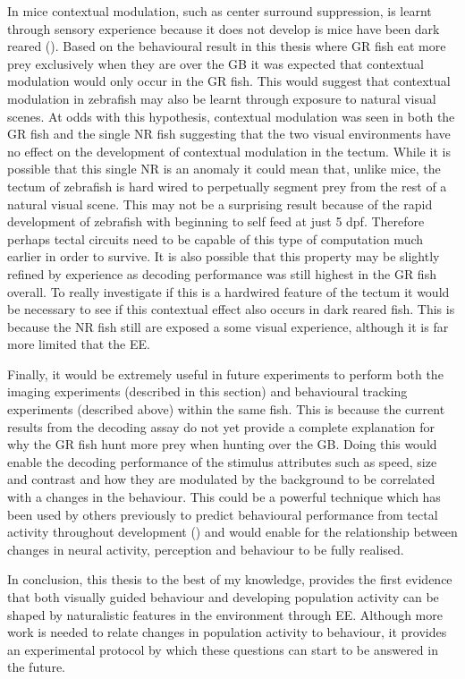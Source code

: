 In mice contextual modulation, such as center surround suppression, is learnt through sensory experience because it does not develop is mice have been dark reared (\cite{Pecka2014Experience-DependentScenes}).  Based on the behavioural result in this thesis where GR fish eat more prey exclusively when they are over the GB it was expected that contextual modulation would only occur in the GR fish. This would suggest that contextual modulation in zebrafish may also be learnt through exposure to natural visual scenes. At odds with this hypothesis, contextual modulation was seen in both the GR fish and the single NR fish suggesting that the two visual environments have no effect on the development of contextual modulation in the tectum. While it is possible that this single NR is an anomaly it could mean that, unlike mice, the tectum of zebrafish is hard wired to perpetually segment prey from the rest of a natural visual scene. This may not be a surprising result because of the rapid development of zebrafish with beginning to self feed at just 5 dpf. Therefore perhaps tectal circuits need to be capable of this type of computation much earlier in order to survive. It is also possible that this property may be slightly refined by experience as decoding performance was still highest in the GR fish overall. To really investigate if this is a hardwired feature of the tectum it would be necessary to see if this contextual effect also occurs in dark reared fish. This is because the NR fish still are exposed a some visual experience, although it is far more limited that the EE.  

Finally, it would be extremely useful in future experiments to perform both the imaging experiments (described in this section) and behavioural tracking experiments (described above) within the same fish. This is because the current results from the decoding assay do not yet provide a complete explanation for why the GR fish hunt more prey when hunting over the GB. Doing this would enable the decoding performance of the stimulus attributes such as speed, size and contrast and how they are modulated by the background to be correlated with a changes in the behaviour. This could be a powerful technique which has been used by others previously to predict behavioural performance from tectal activity throughout development (\cite{Avitan2019}) and would enable for the relationship between changes in neural activity, perception and behaviour to be fully realised.

In conclusion, this thesis to the best of my knowledge, provides the first evidence that both visually guided behaviour and developing population activity can be shaped by naturalistic features in the environment through EE. Although more work is needed to relate changes in population activity to behaviour, it provides an experimental protocol by which these questions can start to be answered in the future.


 
